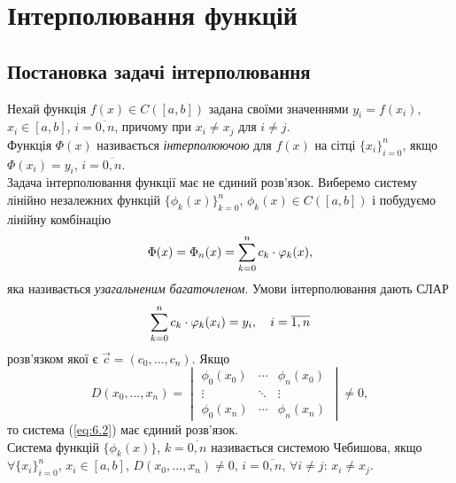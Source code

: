 \section{Інтерполювання функцій}
\subsection{Постановка задачі інтерполювання}
Нехай функція $f(x) \in C([a,b])$ задана своїми значеннями $y_i = f(x_i)$, $x_i \in [a,b]$, $i = \overline{0,n}$, причому при $x_i \ne x_j$ для $i \ne j$. \\

Функція $\Phi(x)$ називається \textit{інтерполюючою} для $f(x)$ на сітці $\{x_i\}_{i=0}^n$, якщо $\Phi(x_i) = y_i$, $i = \overline{0,n}$. \\

Задача інтерполювання функції має не єдиний розв'язок. Виберемо систему лінійно незалежних функцій $\{\phi_k(x)\}_{k=0}^n$, $\phi_k(x) \in C([a,b])$ і побудуємо лінійну комбінацію \begin{equation} \label{eq:6.1} \Phi(x) = \Phi_n(x) = \displaystyle\sum\limits_{k=0}^n c_k \cdot \varphi_k(x), \end{equation} яка називається \textit{узагальненим багаточленом}. Умови інтерполювання дають СЛАР \begin{equation} \label{eq:6.2} \displaystyle\sum\limits_{k=0}^n c_k \cdot \varphi_k(x_i) = y_i, \quad i = \overline{1, n} \end{equation} розв'язком якої є $\vec c = (c_0, \ldots, c_n)$. Якщо \[ D(x_0, \ldots, x_n) = \begin{vmatrix} \phi_0(x_0) & \cdots & \phi_n(x_0) \\  \vdots & \ddots & \vdots \\ \phi_0(x_n) & \cdots & \phi_n(x_n) \end{vmatrix} \ne 0, \] то система (\ref{eq:6.2}) має єдиний розв'язок. \\

Система функцій $\{\phi_k (x)\}$, $k = \overline{0,n}$ називається системою Чебишова, якщо $\forall \{x_i\}_{i=0}^n$, $x_i\in[a,b]$, $D(x_0, \ldots, x_n)\ne 0$, $i=\overline{0,n}$, $\forall i \ne j$: $x_i \ne x_j$. \\

